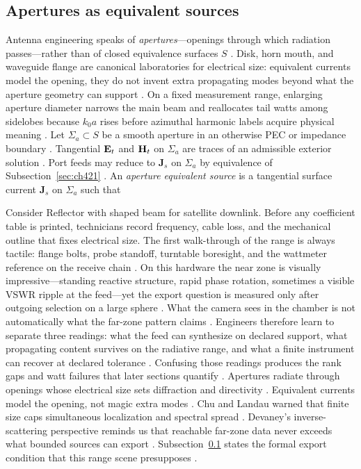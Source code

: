 \subsection{Apertures as equivalent sources}
\label{sec:ch422}
Antenna engineering speaks of \emph{apertures}---openings through which radiation passes---rather than of
closed equivalence surfaces \(S\) \cite{collin2001}. Disk, horn mouth, and waveguide flange are canonical laboratories for electrical size: equivalent currents model the opening, they do not invent extra propagating modes beyond what the aperture geometry can support \cite{stratton1941}. On a fixed measurement range, enlarging aperture diameter narrows the main beam and reallocates tail watts among sidelobes because $k_0 a$ rises before azimuthal harmonic labels acquire physical meaning \cite{chu1948}.
\medskip
Let \(\Sigma_{a}\subset S\) be a smooth aperture in an otherwise PEC or impedance boundary
\cite{collin2001}. Tangential \(\mathbf{E}_{t}\) and \(\mathbf{H}_{t}\) on \(\Sigma_{a}\) are traces of an
admissible exterior solution \cite{stratton1941}. Port feeds may reduce to \(\mathbf{J}_{s}\) on
\(\Sigma_{a}\) by equivalence of Subsection~\ref{sec:ch421} \cite{harrington2001}.
\label{def:ch4.aperture-equivalent-source}
An \emph{aperture equivalent source} is a tangential surface current \(\mathbf{J}_{s}\) on \(\Sigma_{a}\) such
that
\begin{physicalvignette}
Consider Reflector with shaped beam for satellite downlink. Before any coefficient table is printed, technicians record frequency, cable loss, and the mechanical outline that fixes electrical size. The first walk-through of the range is always tactile: flange bolts, probe standoff, turntable boresight, and the wattmeter reference on the receive chain \cite{hansen1988}.
On this hardware the near zone is visually impressive---standing reactive structure, rapid phase rotation, sometimes a visible VSWR ripple at the feed---yet the export question is measured only after outgoing selection on a large sphere \cite{harrington2001}. What the camera sees in the chamber is not automatically what the far-zone pattern claims \cite{stratton1941}.
Engineers therefore learn to separate three readings: what the feed can synthesize on declared support, what propagating content survives on the radiative range, and what a finite instrument can recover at declared tolerance \cite{devaney2004}. Confusing those readings produces the rank gaps and watt failures that later sections quantify \cite{pal2026}.
Apertures radiate through openings whose electrical size sets diffraction and directivity . Equivalent currents model the opening, not magic extra modes .
Chu and Landau warned that finite size caps simultaneous localization and spectral spread \cite{chu1948}. Devaney's inverse-scattering perspective reminds us that reachable far-zone data never exceeds what bounded sources can export \cite{devaney2004}.
Subsection~\ref{sec:ch422} states the formal export condition that this range scene presupposes \cite{stratton1941}.
\end{physicalvignette}
